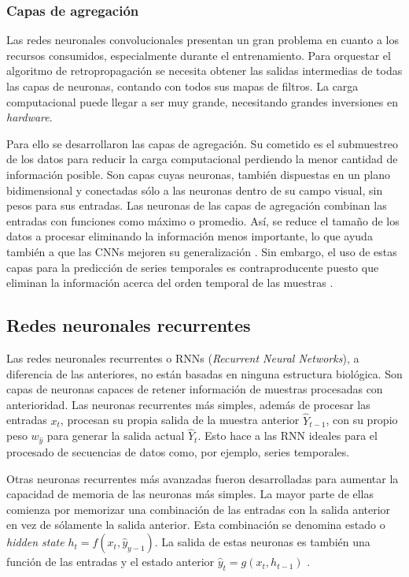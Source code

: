 \subsubsection{Capas de agregación}
Las redes neuronales convolucionales presentan un gran problema en cuanto a los recursos consumidos, especialmente durante el entrenamiento. Para orquestar el algoritmo de retropropagación se necesita obtener las salidas intermedias de todas las capas de neuronas, contando con todos sus mapas de filtros. La carga computacional puede llegar a ser muy grande, necesitando grandes inversiones en \textit{hardware}.

Para ello se desarrollaron las capas de agregación. Su cometido es el submuestreo de los datos para reducir la carga computacional perdiendo la menor cantidad de información posible. Son capas cuyas neuronas, también dispuestas en un plano bidimensional y conectadas sólo a las neuronas dentro de su campo visual, sin pesos para sus entradas. Las neuronas de las capas de agregación combinan las entradas con funciones como máximo o promedio. Así, se reduce el tamaño de los datos a procesar eliminando la información menos importante, lo que ayuda también a que las CNNs mejoren su generalización \cite{machinelearningbook}. Sin embargo, el uso de estas capas para la predicción de series temporales es contraproducente puesto que eliminan la información acerca del orden temporal de las muestras \cite{machinelearningbook1}.

\subsection{Redes neuronales recurrentes}
Las redes neuronales recurrentes o RNNs (\textit{Recurrent Neural Networks}), a diferencia de las anteriores, no están basadas en ninguna estructura biológica. Son capas de neuronas capaces de retener información de muestras procesadas con anterioridad. Las neuronas recurrentes más simples, además de procesar las entradas $x_t$, procesan su propia salida de la muestra anterior $\hat{Y}_{t-1}$, con su propio peso $w_{\hat{y}}$ para generar la salida actual $\hat{Y}_t$. Esto hace a las RNN ideales para el procesado de secuencias de datos como, por ejemplo, series temporales.

Otras neuronas recurrentes más avanzadas fueron desarrolladas para aumentar la capacidad de memoria de las neuronas más simples. La mayor parte de ellas comienza por memorizar una combinación de las entradas con la salida anterior en vez de sólamente la salida anterior. Esta combinación se denomina estado o \textit{hidden state} $h_t=f(x_t,\hat{y}_{y-1})$. La salida de estas neuronas es también una función de las entradas y el estado anterior $\hat{y}_t=g(x_t,h_{t-1})$ \cite{machinelearningbook,rnn,rnn1,rnn2}.

